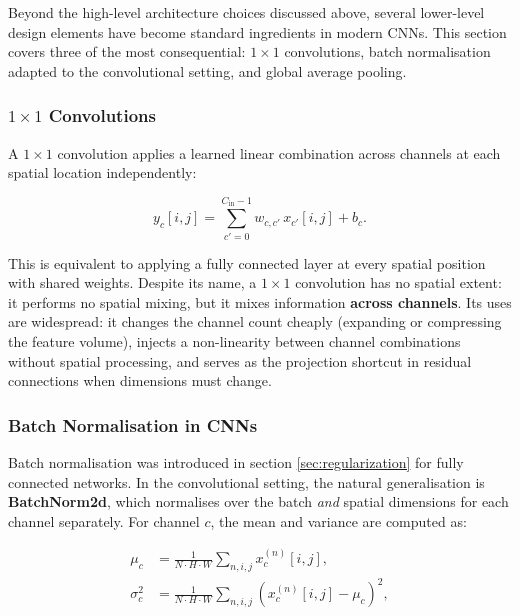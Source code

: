 Beyond the high-level architecture choices discussed above, several lower-level design elements have become standard ingredients in modern CNNs. This section covers three of the most consequential: $1 \times 1$ convolutions, batch normalisation adapted to the convolutional setting, and global average pooling.

\subsubsection{\texorpdfstring{$1 \times 1$}{1x1} Convolutions}

A $1 \times 1$ convolution applies a learned linear combination across channels at each spatial location independently:

\begin{equation}
    y_c[i,j] = \sum_{c'=0}^{C_{\mathrm{in}}-1} w_{c,c'}\, x_{c'}[i,j] + b_c.
    \label{eq:conv1x1}
\end{equation}

This is equivalent to applying a fully connected layer at every spatial position with shared weights. Despite its name, a $1 \times 1$ convolution has no spatial extent: it performs no spatial mixing, but it mixes information \textbf{across channels}. Its uses are widespread: it changes the channel count cheaply (expanding or compressing the feature volume), injects a non-linearity between channel combinations without spatial processing, and serves as the projection shortcut in residual connections when dimensions must change.

\subsubsection{Batch Normalisation in CNNs}

Batch normalisation was introduced in section \ref{sec:regularization} for fully connected networks. In the convolutional setting, the natural generalisation is \textbf{BatchNorm2d}, which normalises over the batch \emph{and} spatial dimensions for each channel separately. For channel $c$, the mean and variance are computed as:

\begin{align}
    \mu_c &= \frac{1}{N \cdot H \cdot W}\sum_{n,i,j} x_c^{(n)}[i,j], \\
    \sigma^2_c &= \frac{1}{N \cdot H \cdot W}\sum_{n,i,j}\left(x_c^{(n)}[i,j] - \mu_c\right)^2,
    \label{eq:batchnorm2d}
\end{align}

